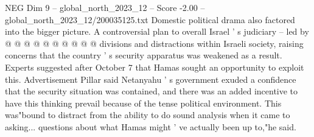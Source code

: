 \begin{textsample}{NEG Dim 9 – global\_north\_2023\_12 – Score -2.00 – global\_north\_2023\_12/200035125.txt}
Domestic political drama also factored into the bigger picture.
A controversial plan to overall Israel ' s judiciary -- led by @ @ @ @ @ @ @ @ @ @ divisions and distractions within Israeli society, raising concerns that the country ' s security apparatus was weakened as a result.
Experts suggested after October 7 that Hamas sought an opportunity to exploit this.
Advertisement Pillar said Netanyahu ' s government exuded a confidence that the security situation was contained, and there was an added incentive to have this thinking prevail because of the tense political environment.
This was"bound to distract from the ability to do sound analysis when it came to asking... questions about what Hamas might ' ve actually been up to,"he said.

\end{textsample}
